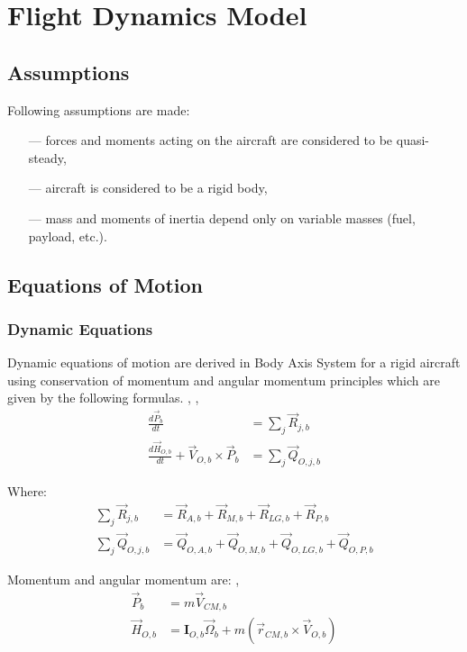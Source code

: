 \chapter{Flight Dynamics Model}

\section{Assumptions}

Following assumptions are made:
\begin{itemize}
  \item[---] forces and moments acting on the aircraft are considered to be quasi-steady,
  \item[---] aircraft is considered to be a rigid body,
  \item[---] mass and moments of inertia depend only on variable masses (fuel, payload, etc.).
\end{itemize}

\section{Equations of Motion}

\subsection{Dynamic Equations}

Dynamic equations of motion are derived in Body Axis System for a rigid aircraft using conservation of momentum and angular momentum principles which are given by the following formulas. \cite{Taylor2005}, \cite{Osinski1997}, \cite{Leyko2002}
\begin{align}
  \label{eq-fdm-mom-deriv-1}
  \frac{d {\vec P}_b}{dt}
  &=
  \sum_{j} {\vec R}_{j,b} \\
  \label{eq-fdm-ang-mom-deriv-1}
  \frac{d {\vec H}_{O,b}}{dt} + {\vec V}_{O,b} \times {\vec P}_b
  &=
  \sum_{j} {\vec Q}_{O,j,b}
\end{align}

Where:
\begin{align}
  \sum_{j} {\vec R}_{j,b}
  &=
  {\vec R}_{A,b} + {\vec R}_{M,b} + {\vec R}_{LG,b} + {\vec R}_{P,b} \\
  \sum_{j} {\vec Q}_{O,j,b}
  &=
  {\vec Q}_{O,A,b} + {\vec Q}_{O,M,b} + {\vec Q}_{O,LG,b} + {\vec Q}_{O,P,b}
\end{align}

Momentum and angular momentum are: \cite{Osinski1997}, \cite{Leyko2002}
\begin{align}
  \label{eq-fdm-mom-1} 
  {\vec P}_b
  &=
  m {\vec V}_{CM,b} \\
  \label{eq-fdm-ang-mom-1}
  {\vec H}_{O,b}
  &=
  {\boldsymbol I}_{O,b} {\vec \Omega}_b
  +
  m \left( {\vec r}_{CM,b}
  \times
  {\vec V}_{O,b} \right)
\end{align}

